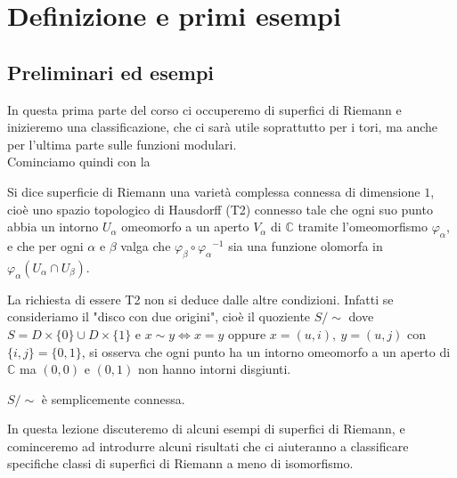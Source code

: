 \chapter{Definizione e primi esempi}

\section{Preliminari ed esempi}
In questa prima parte del corso ci occuperemo di superfici di Riemann e inizieremo una classificazione, che ci sarà utile soprattutto per i tori, ma anche per l'ultima parte sulle funzioni modulari.\\
Cominciamo quindi con la
\begin{definizione}
Si dice superficie di Riemann una varietà complessa connessa di dimensione $1$, cioè uno spazio topologico di Hausdorff (T2)
connesso tale che ogni suo punto abbia un intorno $U_\alpha$ omeomorfo a un aperto $V_\alpha$ di $\mathbb{C}$
tramite l'omeomorfismo $\varphi_\alpha$, e che per ogni $\alpha$ e $\beta$ valga che $\varphi_\beta \circ {\varphi_\alpha}^{-1}$
sia una funzione olomorfa in $\varphi_\alpha \left( U_\alpha \cap U_\beta \right)$.
\end{definizione}

\begin{osservazione}
La richiesta di essere T2 non si deduce dalle altre condizioni. Infatti se consideriamo il "disco con due origini",
cioè il quoziente $S/\!\!\sim$ dove $S=D\times\{0\} \cup D\times\{1\}$ e $x\sim y \Longleftrightarrow x=y$ oppure $x=(u,i),\ y=(u,j)$ con $\{i,j\}=\{0,1\}$,
si osserva che ogni punto ha un intorno omeomorfo a un aperto di $\mathbb{C}$ ma $(0,0)$ e $(0,1)$ non hanno intorni disgiunti.
\end{osservazione}
\begin{esercizio}
$S/\!\!\sim$ è semplicemente connessa.
\end{esercizio}

In questa lezione discuteremo di alcuni esempi di superfici di Riemann, e cominceremo ad introdurre alcuni risultati che ci aiuteranno a classificare specifiche classi di superfici di Riemann a meno di isomorfismo.

